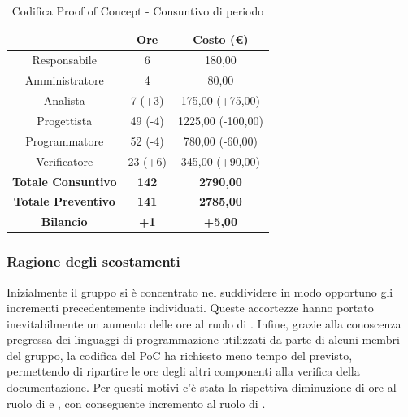 \begin{table}[H]
  \centering
  \renewcommand{\arraystretch}{1.8}
  \begin{tabular}{c|c|c}
    \rowcolor[HTML]{125E28}
    \multicolumn{1}{c}{\color[HTML]{FFFFFF}\textbf{Ruolo}} &
    \multicolumn{1}{c}{\color[HTML]{FFFFFF}\textbf{Ore}}   &
    \multicolumn{1}{c}{\color[HTML]{FFFFFF}\textbf{Costo (€)}}                                \\
    \hline
    Responsabile                                           & 6            & 180,00            \\
    Amministratore                                         & 4            & 80,00             \\
    Analista                                               & 7 (+3)       & 175,00 (+75,00)   \\
    Progettista                                            & 49 (-4)      & 1225,00 (-100,00) \\
    Programmatore                                          & 52 (-4)      & 780,00 (-60,00)   \\
    Verificatore                                           & 23 (+6)      & 345,00 (+90,00)   \\
    \textbf{Totale Consuntivo}                             & \textbf{142} & \textbf{2790,00}  \\
    \textbf{Totale Preventivo}                             & \textbf{141} & \textbf{2785,00}  \\
    \textbf{Bilancio}                                      & \textbf{+1}  & \textbf{+5,00}    \\
  \end{tabular}
  \caption{Codifica Proof of Concept - Consuntivo di periodo}
\end{table}

\pagebreak
\subsubsection{Ragione degli scostamenti} \label{subsubsection:ragione_scostamenti_PoC}
Inizialmente il gruppo si è concentrato nel suddividere in modo opportuno gli incrementi precedentemente individuati.
Queste accortezze hanno portato inevitabilmente un aumento delle ore al ruolo di \roleAnalystLow{}.
Infine, grazie alla conoscenza pregressa dei linguaggi di programmazione utilizzati da parte di alcuni membri del gruppo, la codifica del PoC\glo{} ha richiesto meno tempo del previsto, permettendo di ripartire le ore degli altri componenti alla verifica della documentazione.
Per questi motivi c'è stata la rispettiva diminuzione di ore al ruolo di \roleDesignerLow{} e \roleProgrammerLow{}, con conseguente incremento al ruolo di \roleVerifierLow{}.

